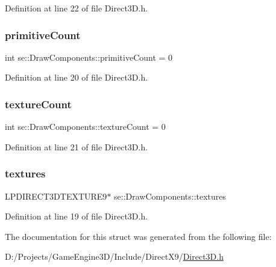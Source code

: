 Definition at line 22 of file Direct3\+D.\+h.

\mbox{\label{structse_1_1_draw_components_af74ab24e473de232a1df0166109cbafd}} 
\subsubsection{\texorpdfstring{primitive\+Count}{primitiveCount}}
{\footnotesize\ttfamily int se\+::\+Draw\+Components\+::primitive\+Count = 0}



Definition at line 20 of file Direct3\+D.\+h.

\mbox{\label{structse_1_1_draw_components_a4a4323bb918073fe2c6cf45ee3c885d2}} 
\subsubsection{\texorpdfstring{texture\+Count}{textureCount}}
{\footnotesize\ttfamily int se\+::\+Draw\+Components\+::texture\+Count = 0}



Definition at line 21 of file Direct3\+D.\+h.

\mbox{\label{structse_1_1_draw_components_a5853cbdf5f707c4cd3cffb09678cfe18}} 
\subsubsection{\texorpdfstring{textures}{textures}}
{\footnotesize\ttfamily L\+P\+D\+I\+R\+E\+C\+T3\+D\+T\+E\+X\+T\+U\+R\+E9$\ast$ se\+::\+Draw\+Components\+::textures}



Definition at line 19 of file Direct3\+D.\+h.



The documentation for this struct was generated from the following file\+:\begin{DoxyCompactItemize}
\item 
D\+:/\+Projects/\+Game\+Engine3\+D/\+Include/\+Direct\+X9/\mbox{\hyperlink{_direct3_d_8h}{Direct3\+D.\+h}}\end{DoxyCompactItemize}
